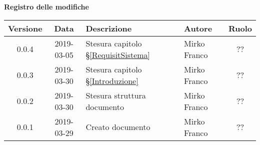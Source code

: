 	\begin{center}
		\textbf{Registro delle modifiche}
	\end{center}
	\begin{center}
		\begin{tabularx}{\textwidth}{|c|c|X|X|c|}
			\hline
			\textbf{Versione} & \textbf{Data} & \textbf{Descrizione} & \textbf{Autore} & \textbf{Ruolo} \\
			\hline
			0.0.4 & 2019-03-05 & Stesura capitolo \S\ref{RequisitSistema} & Mirko Franco & ?? \\
			\hline
			0.0.3 & 2019-03-30 & Stesura capitolo \S\ref{Introduzione} & Mirko Franco & ?? \\
			\hline
			0.0.2 & 2019-03-30 & Stesura struttura documento & Mirko Franco & ?? \\
			\hline
			0.0.1 & 2019-03-29 & Creato documento & Mirko Franco & ?? \\
			\hline
		\end{tabularx}
	\end{center}
\newpage
